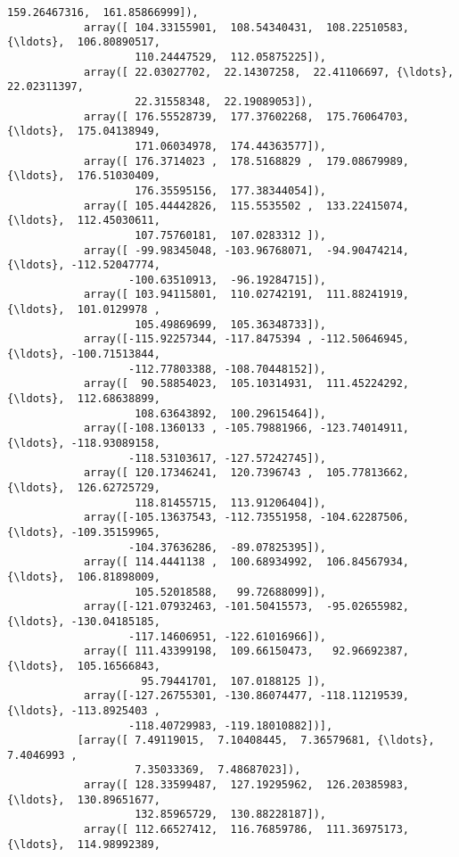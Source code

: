 \documentclass[11pt]{article}
\begin{document}
\begin{Verbatim}[commandchars=\\\{\}]
                    159.26467316,  161.85866999]),
            array([ 104.33155901,  108.54340431,  108.22510583, {\ldots},  106.80890517,
                    110.24447529,  112.05875225]),
            array([ 22.03027702,  22.14307258,  22.41106697, {\ldots},  22.02311397,
                    22.31558348,  22.19089053]),
            array([ 176.55528739,  177.37602268,  175.76064703, {\ldots},  175.04138949,
                    171.06034978,  174.44363577]),
            array([ 176.3714023 ,  178.5168829 ,  179.08679989, {\ldots},  176.51030409,
                    176.35595156,  177.38344054]),
            array([ 105.44442826,  115.5535502 ,  133.22415074, {\ldots},  112.45030611,
                    107.75760181,  107.0283312 ]),
            array([ -99.98345048, -103.96768071,  -94.90474214, {\ldots}, -112.52047774,
                   -100.63510913,  -96.19284715]),
            array([ 103.94115801,  110.02742191,  111.88241919, {\ldots},  101.0129978 ,
                    105.49869699,  105.36348733]),
            array([-115.92257344, -117.8475394 , -112.50646945, {\ldots}, -100.71513844,
                   -112.77803388, -108.70448152]),
            array([  90.58854023,  105.10314931,  111.45224292, {\ldots},  112.68638899,
                    108.63643892,  100.29615464]),
            array([-108.1360133 , -105.79881966, -123.74014911, {\ldots}, -118.93089158,
                   -118.53103617, -127.57242745]),
            array([ 120.17346241,  120.7396743 ,  105.77813662, {\ldots},  126.62725729,
                    118.81455715,  113.91206404]),
            array([-105.13637543, -112.73551958, -104.62287506, {\ldots}, -109.35159965,
                   -104.37636286,  -89.07825395]),
            array([ 114.4441138 ,  100.68934992,  106.84567934, {\ldots},  106.81898009,
                    105.52018588,   99.72688099]),
            array([-121.07932463, -101.50415573,  -95.02655982, {\ldots}, -130.04185185,
                   -117.14606951, -122.61016966]),
            array([ 111.43399198,  109.66150473,   92.96692387, {\ldots},  105.16566843,
                     95.79441701,  107.0188125 ]),
            array([-127.26755301, -130.86074477, -118.11219539, {\ldots}, -113.8925403 ,
                   -118.40729983, -119.18010882])],
           [array([ 7.49119015,  7.10408445,  7.36579681, {\ldots},  7.4046993 ,
                    7.35033369,  7.48687023]),
            array([ 128.33599487,  127.19295962,  126.20385983, {\ldots},  130.89651677,
                    132.85965729,  130.88228187]),
            array([ 112.66527412,  116.76859786,  111.36975173, {\ldots},  114.98992389,

\end{Verbatim}
\end{document}
